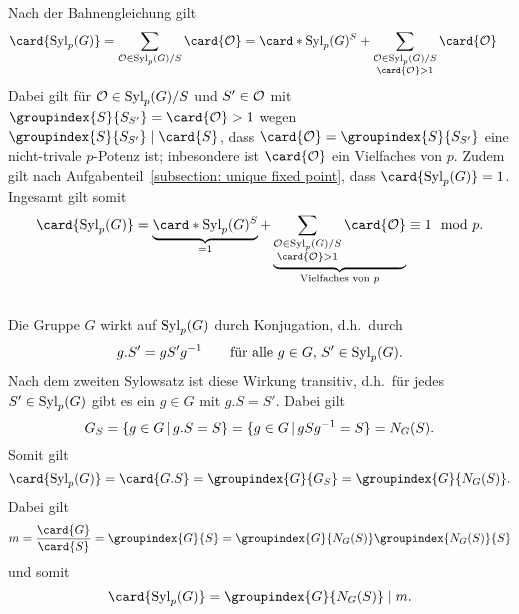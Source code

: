 \subsection{}

Nach der Bahnengleichung gilt
\begin{align*}
      \card{\Sylow{p}{G}}
  &=  \sum_{\orbit \in \Sylow{p}{G}/S} \card{\orbit}
   =    \card*{\Sylow{p}{G}^S}
      + \sum_{\substack{\orbit \in \Sylow{p}{G}/S \\ \card{\orbit} > 1}} \card{\orbit}
\end{align*}
Dabei gilt für $\mathcal{O} \in \operatorname{Syl}_{p}(G)/S$ und $S' \in \mathcal{O}$ mit $\groupindex{S}{S_{S'}} = \card{\orbit} > 1$ wegen $\groupindex{S}{S_{S'}} \divides \card{S}$, dass $\card{\orbit} = \groupindex{S}{S_{S'}}$ eine nicht-trivale $p$-Potenz ist;
inbesondere ist $\card{\orbit}$ ein Vielfaches von $p$.
Zudem gilt nach Aufgabenteil~\ref{subsection: unique fixed point}, dass $\card{\Sylow{p}{G}} = 1$.
Ingesamt gilt somit
\[
          \card{\Sylow{p}{G}}
  =       \underbrace{ \card*{\Sylow{p}{G}^S} }_{=1}
          + \underbrace{
            \sum_{\substack{\orbit \in \Sylow{p}{G}/S \\ \card{\orbit} > 1}} \card{\orbit}
            }_{\text{Vielfaches von $p$}}
  \equiv  1
  \mod    p.
\]





\subsection{}

Die Gruppe $G$ wirkt auf $\operatorname{Syl}_{p}(G)$ durch Konjugation, d.h.\ durch
\[
    g.S'
  = g S' g^{-1}
  \qquad
  \text{für alle $g \in G$, $S' \in \operatorname{Syl}_{p}(G)$}.
\]
Nach dem zweiten Sylowsatz ist diese Wirkung transitiv, d.h.\ für jedes $S' \in \operatorname{Syl}_{p}(G)$ gibt es ein $g \in G$ mit $g.S = S'$.
Dabei gilt
\[
    G_S
  = \{ g \in G \suchthat g.S = S \}
  = \{ g \in G \suchthat g S g^{-1} = S \}
  = \normalizer{S}{G}.
\]
Somit gilt
\[
    \card{\Sylow{p}{G}}
  = \card{G.S}
  = \groupindex{G}{G_S}
  = \groupindex{G}{\normalizer{S}{G}}.
\]
Dabei gilt
\[
    m
  = \frac{\card{G}}{\card{S}}
  = \groupindex{G}{S}
  = \groupindex{G}{\normalizer{S}{G}} \groupindex{\normalizer{S}{G}}{S}
\]
und somit
\[
            \card{\Sylow{p}{G}}
  =         \groupindex{G}{\normalizer{S}{G}}
  \divides  m.
\]




